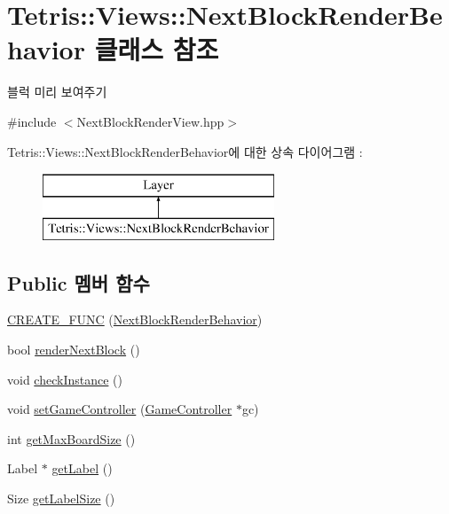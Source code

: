 \hypertarget{class_tetris_1_1_views_1_1_next_block_render_behavior}{}\section{Tetris\+:\+:Views\+:\+:Next\+Block\+Render\+Behavior 클래스 참조}
\label{class_tetris_1_1_views_1_1_next_block_render_behavior}


블럭 미리 보여주기  




{\ttfamily \#include $<$Next\+Block\+Render\+View.\+hpp$>$}

Tetris\+:\+:Views\+:\+:Next\+Block\+Render\+Behavior에 대한 상속 다이어그램 \+: \begin{figure}[H]
\begin{center}
\leavevmode
\includegraphics[height=2.000000cm]{class_tetris_1_1_views_1_1_next_block_render_behavior}
\end{center}
\end{figure}
\subsection*{Public 멤버 함수}
\begin{DoxyCompactItemize}
\item 
\hyperlink{class_tetris_1_1_views_1_1_next_block_render_behavior_a34915309c31047bd6d7244ed7002edd1}{C\+R\+E\+A\+T\+E\+\_\+\+F\+U\+NC} (\hyperlink{class_tetris_1_1_views_1_1_next_block_render_behavior}{Next\+Block\+Render\+Behavior})
\item 
bool \hyperlink{class_tetris_1_1_views_1_1_next_block_render_behavior_aa9240528e0603ca129d7877f9e71b27d}{render\+Next\+Block} ()
\item 
void \hyperlink{class_tetris_1_1_views_1_1_next_block_render_behavior_a5593a27688fa599f7315c48ee0a0dfb6}{check\+Instance} ()
\item 
void \hyperlink{class_tetris_1_1_views_1_1_next_block_render_behavior_a35709270c896ca2a21266b52727412ae}{set\+Game\+Controller} (\hyperlink{class_tetris_1_1_game_controller}{Game\+Controller} $\ast$gc)
\item 
int \hyperlink{class_tetris_1_1_views_1_1_next_block_render_behavior_aa1d5fbc45ec963fa86fff0f73359d028}{get\+Max\+Board\+Size} ()
\item 
Label $\ast$ \hyperlink{class_tetris_1_1_views_1_1_next_block_render_behavior_abcabe24356de7c9a512ea3a1b3d9b1bf}{get\+Label} ()
\item 
Size \hyperlink{class_tetris_1_1_views_1_1_next_block_render_behavior_a5eb782a4171baf98f967d5a048cfe243}{get\+Label\+Size} ()
\end{DoxyCompactItemize}

